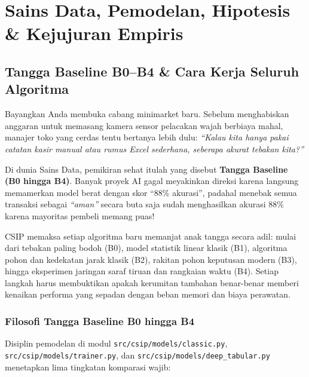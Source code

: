 \documentclass[11pt,a4paper,oneside]{book}
\newcommand{\code}[1]{{\small\nolinkurl{#1}}}
\begin{document}
\part{Sains Data, Pemodelan, Hipotesis \& Kejujuran Empiris}

\chapter{Tangga Baseline B0--B4 \& Cara Kerja Seluruh Algoritma}

\begin{bisnisbox}
Bayangkan Anda membuka cabang minimarket baru. Sebelum menghabiskan anggaran untuk memasang kamera sensor pelacakan wajah berbiaya mahal, manajer toko yang cerdas tentu bertanya lebih dulu: \emph{``Kalau kita hanya pakai catatan kasir manual atau rumus Excel sederhana, seberapa akurat tebakan kita?''}

Di dunia Sains Data, pemikiran sehat itulah yang disebut \textbf{Tangga Baseline (B0 hingga B4)}. Banyak proyek AI gagal meyakinkan direksi karena langsung memamerkan model berat dengan skor ``88\% akurasi'', padahal menebak semua transaksi sebagai \emph{``aman''} secara buta saja sudah menghasilkan akurasi 88\% karena mayoritas pembeli memang puas!

CSIP memaksa setiap algoritma baru memanjat anak tangga secara adil: mulai dari tebakan paling bodoh (B0), model statistik linear klasik (B1), algoritma pohon dan kedekatan jarak klasik (B2), rakitan pohon keputusan modern (B3), hingga eksperimen jaringan saraf tiruan dan rangkaian waktu (B4). Setiap langkah harus membuktikan apakah kerumitan tambahan benar-benar memberi kenaikan performa yang sepadan dengan beban memori dan biaya perawatan.
\end{bisnisbox}

\section{Filosofi Tangga Baseline B0 hingga B4}

Disiplin pemodelan di modul \code{src/csip/models/classic.py}, \code{src/csip/models/trainer.py}, dan \code{src/csip/models/deep_tabular.py} menetapkan lima tingkatan komparasi wajib:
\end{document}
